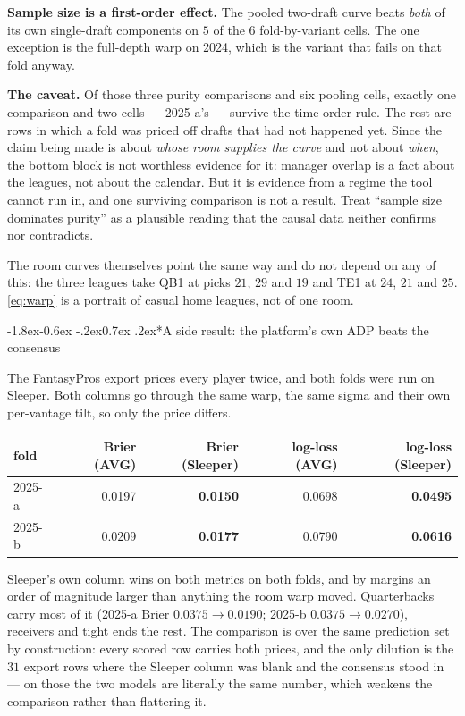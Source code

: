 \documentclass[10pt,a4paper]{article}
\makeatletter
\theoremstyle{plain}
\theoremstyle{definition}
\theoremstyle{remark}
\renewcommand\subsubsection{\@startsection{subsubsection}{3}{\z@}%
  {-1.8ex\@plus -0.6ex \@minus -.2ex}{0.7ex \@plus .2ex}{\normalfont\normalsize\bfseries}}
\makeatother
\begin{document}
\textbf{Sample size is a first-order effect.} The pooled two-draft curve beats \emph{both}
of its own single-draft components on $5$ of the $6$ fold-by-variant cells. The one
exception is the full-depth warp on 2024, which is the variant that fails on that fold
anyway.

\textbf{The caveat.} Of those three purity comparisons and six pooling cells, exactly one
comparison and two cells --- 2025-a's --- survive the time-order rule. The rest are rows in
which a fold was priced off drafts that had not happened yet. Since the claim being made is
about \emph{whose room supplies the curve} and not about \emph{when}, the bottom block is
not worthless evidence for it: manager overlap is a fact about the leagues, not about the
calendar. But it is evidence from a regime the tool cannot run in, and one surviving
comparison is not a result. Treat ``sample size dominates purity'' as a plausible reading
that the causal data neither confirms nor contradicts.

The room curves themselves point the same way and do not depend on any of this: the three
leagues take QB1 at picks $21$, $29$ and $19$ and TE1 at $24$, $21$ and $25$.
\eqref{eq:warp} is a portrait of casual home leagues, not of one room.

\subsubsection*{A side result: the platform's own ADP beats the consensus}

The FantasyPros export prices every player twice, and both folds were run on Sleeper. Both
columns go through the same warp, the same sigma and their own per-vantage tilt, so only
the price differs.

\begin{center}
\small
\begin{tabular}{lrrrr}
\toprule
fold & Brier (AVG) & Brier (Sleeper) & log-loss (AVG) & log-loss (Sleeper) \\
\midrule
2025-a & 0.0197 & \textbf{0.0150} & 0.0698 & \textbf{0.0495} \\
2025-b & 0.0209 & \textbf{0.0177} & 0.0790 & \textbf{0.0616} \\
\bottomrule
\end{tabular}
\end{center}

Sleeper's own column wins on both metrics on both folds, and by margins an order of
magnitude larger than anything the room warp moved. Quarterbacks carry most of it
(2025-a Brier $0.0375 \to 0.0190$; 2025-b $0.0375 \to 0.0270$), receivers and tight ends
the rest. The comparison is over the same prediction set by construction: every scored row
carries both prices, and the only dilution is the $31$ export rows where the Sleeper
column was blank and the consensus stood in --- on those the two models are literally the
same number, which weakens the comparison rather than flattering it.
\end{document}
